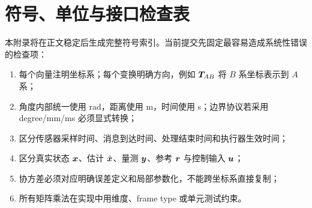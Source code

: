 \chapter{符号、单位与接口检查表}
\label{app:notation}

本附录将在正文稳定后生成完整符号索引。当前提交先固定最容易造成系统性错误的检查项：

\begin{enumerate}
  \item 每个向量注明坐标系；每个变换明确方向，例如 $\bm{T}_{AB}$ 将 $B$ 系坐标表示到 $A$ 系；
  \item 角度内部统一使用 rad，距离使用 m，时间使用 s；边界协议若采用 degree/mm/ms 必须显式转换；
  \item 区分传感器采样时间、消息到达时间、处理结束时间和执行器生效时间；
  \item 区分真实状态 $\bm{x}$、估计 $\hat{\bm{x}}$、量测 $\bm{y}$、参考 $\bm{r}$ 与控制输入 $\bm{u}$；
  \item 协方差必须对应明确误差定义和局部参数化，不能跨坐标系直接复制；
  \item 所有矩阵乘法在实现中用维度、frame type 或单元测试约束。
\end{enumerate}

